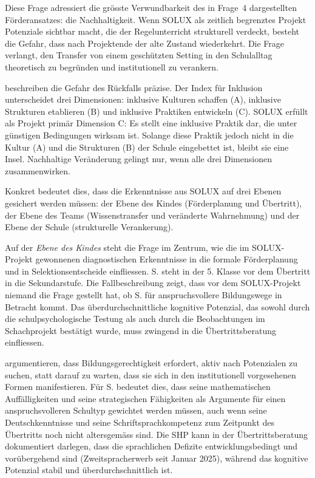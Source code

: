 \documentclass[ngerman, a4paper]{article}
\begin{document}
Diese Frage adressiert die grösste Verwundbarkeit des in Frage~4 dargestellten
Förderansatzes: die Nachhaltigkeit. Wenn SOLUX als zeitlich begrenztes Projekt
Potenziale sichtbar macht, die der Regelunterricht strukturell verdeckt, besteht die
Gefahr, dass nach Projektende der alte Zustand wiederkehrt. Die Frage verlangt,
den Transfer von einem geschützten Setting in den Schulalltag theoretisch zu begründen
und institutionell zu verankern.

\textcite[Dim.\,A--C]{booth2019index} beschreiben die Gefahr des Rückfalls präzise.
Der Index für Inklusion unterscheidet drei Dimensionen: inklusive Kulturen schaffen
(A), inklusive Strukturen etablieren (B) und inklusive Praktiken entwickeln (C).
SOLUX erfüllt als Projekt primär Dimension C: Es stellt eine inklusive Praktik
dar, die unter günstigen Bedingungen wirksam ist. Solange diese Praktik jedoch
nicht in die Kultur (A) und die Strukturen (B) der Schule eingebettet ist, bleibt
sie eine Insel. Nachhaltige Veränderung gelingt nur, wenn alle drei Dimensionen
zusammenwirken.

Konkret bedeutet dies, dass die Erkenntnisse aus SOLUX auf drei Ebenen gesichert
werden müssen: der Ebene des Kindes (Förderplanung und Übertritt), der Ebene des
Teams (Wissenstransfer und veränderte Wahrnehmung) und der Ebene der Schule
(strukturelle Verankerung).

Auf der \textit{Ebene des Kindes} steht die Frage im Zentrum, wie die im
SOLUX-Projekt gewonnenen diagnostischen Erkenntnisse in die formale
Förderplanung und in Selektionsentscheide einfliessen. S. steht in der
5. Klasse vor dem Übertritt in die Sekundarstufe. Die Fallbeschreibung zeigt,
dass vor dem SOLUX-Projekt niemand die Frage gestellt hat, ob S. für
anspruchsvollere Bildungswege in Betracht kommt. Das überdurchschnittliche
kognitive Potenzial, das sowohl durch die schulpsychologische Testung als
auch durch die Beobachtungen im Schachprojekt bestätigt wurde, muss zwingend
in die Übertrittsberatung einfliessen.

\textcite[S.\,65--76]{sedmak2021bildungsgerechtigkeit} argumentieren, dass Bildungsgerechtigkeit erfordert, aktiv
nach Potenzialen zu suchen, statt darauf zu warten, dass sie sich in den
institutionell vorgesehenen Formen manifestieren. Für S. bedeutet dies, dass seine
mathematischen Auffälligkeiten und seine strategischen Fähigkeiten als
Argumente für einen anspruchsvolleren Schultyp gewichtet werden müssen, auch
wenn seine Deutschkenntnisse und seine Schriftsprachkompetenz zum Zeitpunkt
des Übertritts noch nicht altersgemäss sind. Die SHP kann in der
Übertrittsberatung dokumentiert darlegen, dass die sprachlichen Defizite
entwicklungsbedingt und vorübergehend sind (Zweitspracherwerb seit Januar 2025),
während das kognitive Potenzial stabil und überdurchschnittlich ist.
\end{document}
